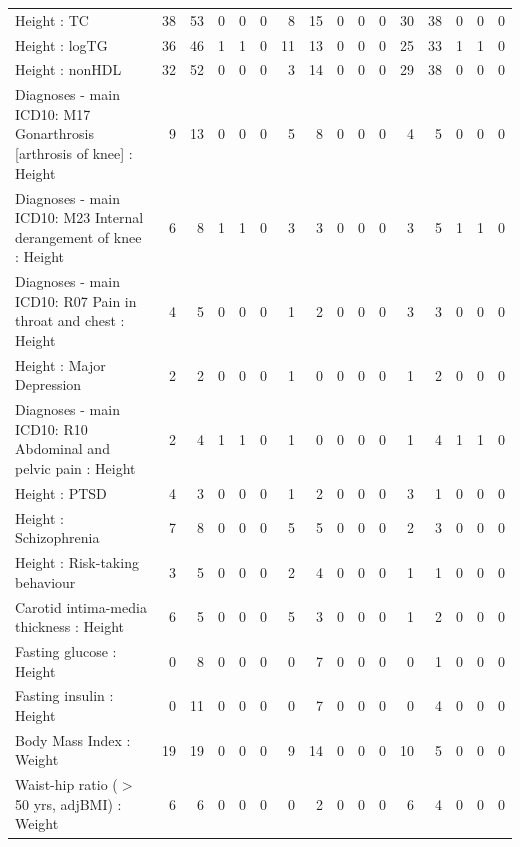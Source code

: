 \begin{table}[ht]
\begin{tabular}{lrrrrrrrrrrrrrrr}
  Height  : TC &  38 &  53 &   0 &   0 &   0 &   8 &  15 &   0 &   0 &   0 &  30 &  38 &   0 &   0 &   0 \\ 
  Height  : logTG &  36 &  46 &   1 &   1 &   0 &  11 &  13 &   0 &   0 &   0 &  25 &  33 &   1 &   1 &   0 \\ 
  Height  : nonHDL &  32 &  52 &   0 &   0 &   0 &   3 &  14 &   0 &   0 &   0 &  29 &  38 &   0 &   0 &   0 \\ 
  Diagnoses - main ICD10: M17 Gonarthrosis [arthrosis of knee] : Height  &   9 &  13 &   0 &   0 &   0 &   5 &   8 &   0 &   0 &   0 &   4 &   5 &   0 &   0 &   0 \\ 
  Diagnoses - main ICD10: M23 Internal derangement of knee : Height  &   6 &   8 &   1 &   1 &   0 &   3 &   3 &   0 &   0 &   0 &   3 &   5 &   1 &   1 &   0 \\ 
  Diagnoses - main ICD10: R07 Pain in throat and chest : Height  &   4 &   5 &   0 &   0 &   0 &   1 &   2 &   0 &   0 &   0 &   3 &   3 &   0 &   0 &   0 \\ 
  Height  : Major Depression &   2 &   2 &   0 &   0 &   0 &   1 &   0 &   0 &   0 &   0 &   1 &   2 &   0 &   0 &   0 \\ 
  Diagnoses - main ICD10: R10 Abdominal and pelvic pain : Height  &   2 &   4 &   1 &   1 &   0 &   1 &   0 &   0 &   0 &   0 &   1 &   4 &   1 &   1 &   0 \\ 
  Height  : PTSD &   4 &   3 &   0 &   0 &   0 &   1 &   2 &   0 &   0 &   0 &   3 &   1 &   0 &   0 &   0 \\ 
  Height  : Schizophrenia &   7 &   8 &   0 &   0 &   0 &   5 &   5 &   0 &   0 &   0 &   2 &   3 &   0 &   0 &   0 \\ 
  Height  : Risk-taking behaviour &   3 &   5 &   0 &   0 &   0 &   2 &   4 &   0 &   0 &   0 &   1 &   1 &   0 &   0 &   0 \\ 
  Carotid intima-media thickness : Height  &   6 &   5 &   0 &   0 &   0 &   5 &   3 &   0 &   0 &   0 &   1 &   2 &   0 &   0 &   0 \\ 
  Fasting glucose : Height  &   0 &   8 &   0 &   0 &   0 &   0 &   7 &   0 &   0 &   0 &   0 &   1 &   0 &   0 &   0 \\ 
  Fasting insulin : Height  &   0 &  11 &   0 &   0 &   0 &   0 &   7 &   0 &   0 &   0 &   0 &   4 &   0 &   0 &   0 \\ 
  Body Mass Index  : Weight  &  19 &  19 &   0 &   0 &   0 &   9 &  14 &   0 &   0 &   0 &  10 &   5 &   0 &   0 &   0 \\ 
  Waist-hip ratio ($>$ 50 yrs, adjBMI) : Weight  &   6 &   6 &   0 &   0 &   0 &   0 &   2 &   0 &   0 &   0 &   6 &   4 &   0 &   0 &   0 \\ 

\end{tabular}
\end{table}
